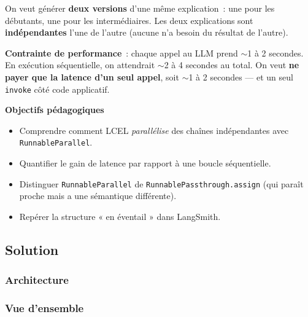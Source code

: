 \documentclass[11pt,a4paper]{article}
\begin{document}
\begin{tcolorbox}[title=Exercice 4. \texttt{RunnableParallel}]
On veut générer \textbf{deux versions} d'une même explication~: une pour
les débutants, une pour les intermédiaires. Les deux explications sont
\textbf{indépendantes} l'une de l'autre (aucune n'a besoin du résultat de
l'autre).

\textbf{Contrainte de performance}~: chaque appel au LLM prend
$\sim$1 à 2 secondes. En exécution séquentielle, on attendrait
$\sim$2 à 4 secondes au total. On veut \textbf{ne payer que la latence
d'un seul appel}, soit $\sim$1 à 2 secondes — et un seul \texttt{invoke}
côté code applicatif.

\bigskip
\noindent\textbf{Objectifs pédagogiques}
\begin{itemize}[leftmargin=*]
  \item Comprendre comment LCEL \emph{parallélise} des chaînes indépendantes
        avec \texttt{RunnableParallel}.
  \item Quantifier le gain de latence par rapport à une boucle séquentielle.
  \item Distinguer \texttt{RunnableParallel} de
        \texttt{RunnablePassthrough.assign} (qui paraît proche mais a une
        sémantique différente).
  \item Repérer la structure « en éventail » dans LangSmith.
\end{itemize}
\end{tcolorbox}

\subsection{Solution}

\subsubsection{Architecture}

\subsubsection*{Vue d'ensemble}
\end{document}
